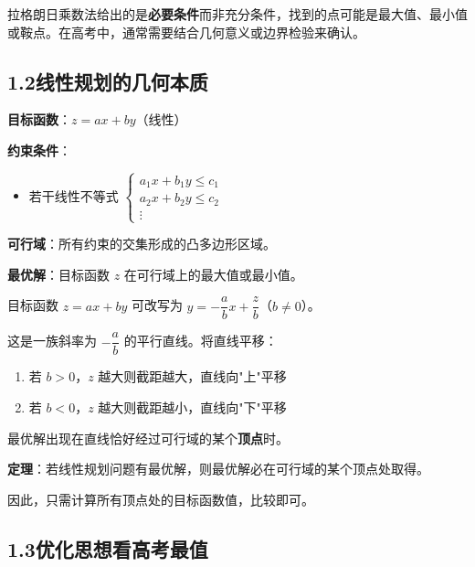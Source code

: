 \documentclass[12pt, a4paper]{ctexart}
\begin{document}
\begin{warnbox}[易错提醒]
拉格朗日乘数法给出的是\textbf{必要条件}而非充分条件，找到的点可能是最大值、最小值或鞍点。在高考中，通常需要结合几何意义或边界检验来确认。
\end{warnbox}

\subsection*{1.2\quad 线性规划的几何本质}

\begin{knowledgebox}[线性规划问题]
\textbf{目标函数}：$z = ax + by$（线性）

\textbf{约束条件}：
\begin{itemize}
  \item 若干线性不等式 $\begin{cases} a_1 x + b_1 y \le c_1 \\ a_2 x + b_2 y \le c_2 \\ \vdots \end{cases}$
\end{itemize}

\textbf{可行域}：所有约束的交集形成的凸多边形区域。

\textbf{最优解}：目标函数 $z$ 在可行域上的最大值或最小值。
\end{knowledgebox}

\begin{tipbox}
目标函数 $z = ax + by$ 可改写为 $y = -\dfrac{a}{b}x + \dfrac{z}{b}$（$b \ne 0$）。

这是一族斜率为 $-\dfrac{a}{b}$ 的平行直线。将直线平移：
\begin{enumerate}[label=(\arabic*)]
  \item 若 $b > 0$，$z$ 越大则截距越大，直线向"上"平移
  \item 若 $b < 0$，$z$ 越大则截距越小，直线向"下"平移
\end{enumerate}
最优解出现在直线恰好经过可行域的某个\textbf{顶点}时。
\end{tipbox}

\begin{warnbox}[线性规划的核心结论]
\textbf{定理}：若线性规划问题有最优解，则最优解必在可行域的某个顶点处取得。

因此，只需计算所有顶点处的目标函数值，比较即可。
\end{warnbox}

\subsection*{1.3\quad 优化思想看高考最值}
\end{document}

